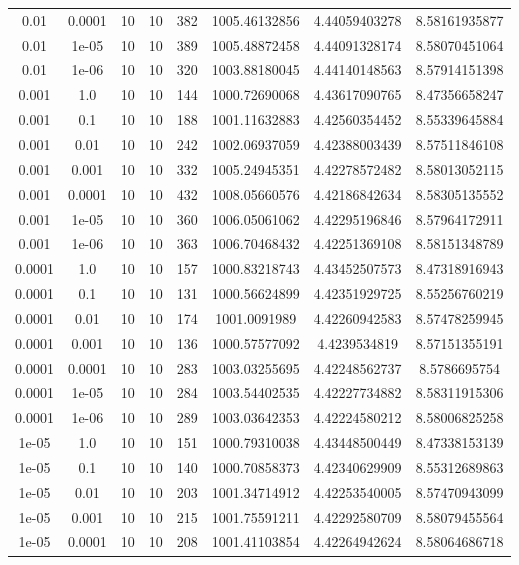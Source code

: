 \documentclass[11pt,a4paper]{article}
\begin{document}
\begin{table}
{\begin{tabular}{*{8}c}
 0.01 & 0.0001 &10 &10 & 382& 1005.46132856 & 4.44059403278 & 8.58161935877 \\
 0.01 & 1e-05 &10 &10 & 389& 1005.48872458 & 4.44091328174 & 8.58070451064 \\
 0.01 & 1e-06 &10 &10 & 320& 1003.88180045 & 4.44140148563 & 8.57914151398 \\
 0.001 & 1.0 &10 &10 & 144& 1000.72690068 & 4.43617090765 & 8.47356658247 \\
 0.001 & 0.1 &10 &10 & 188& 1001.11632883 & 4.42560354452 & 8.55339645884 \\
 0.001 & 0.01 &10 &10 & 242& 1002.06937059 & 4.42388003439 & 8.57511846108 \\
 0.001 & 0.001 &10 &10 & 332& 1005.24945351 & 4.42278572482 & 8.58013052115 \\
 0.001 & 0.0001 &10 &10 & 432& 1008.05660576 & 4.42186842634 & 8.58305135552 \\
 0.001 & 1e-05 &10 &10 & 360& 1006.05061062 & 4.42295196846 & 8.57964172911 \\
 0.001 & 1e-06 &10 &10 & 363& 1006.70468432 & 4.42251369108 & 8.58151348789 \\
 0.0001 & 1.0 &10 &10 & 157& 1000.83218743 & 4.43452507573 & 8.47318916943 \\
 0.0001 & 0.1 &10 &10 & 131& 1000.56624899 & 4.42351929725 & 8.55256760219 \\
 0.0001 & 0.01 &10 &10 & 174& 1001.0091989 & 4.42260942583 & 8.57478259945 \\
 0.0001 & 0.001 &10 &10 & 136& 1000.57577092 & 4.4239534819 & 8.57151355191 \\
 0.0001 & 0.0001 &10 &10 & 283& 1003.03255695 & 4.42248562737 & 8.5786695754 \\
 0.0001 & 1e-05 &10 &10 & 284& 1003.54402535 & 4.42227734882 & 8.58311915306 \\
 0.0001 & 1e-06 &10 &10 & 289& 1003.03642353 & 4.42224580212 & 8.58006825258 \\
 1e-05 & 1.0 &10 &10 & 151& 1000.79310038 & 4.43448500449 & 8.47338153139 \\
 1e-05 & 0.1 &10 &10 & 140& 1000.70858373 & 4.42340629909 & 8.55312689863 \\
 1e-05 & 0.01 &10 &10 & 203& 1001.34714912 & 4.42253540005 & 8.57470943099 \\
 1e-05 & 0.001 &10 &10 & 215& 1001.75591211 & 4.42292580709 & 8.58079455564 \\
 1e-05 & 0.0001 &10 &10 & 208& 1001.41103854 & 4.42264942624 & 8.58064686718 \\

\end{tabular}}
\end{table}
\end{document}
